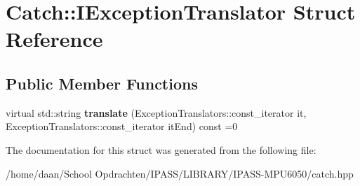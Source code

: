 \hypertarget{structCatch_1_1IExceptionTranslator}{}\section{Catch\+:\+:I\+Exception\+Translator Struct Reference}
\label{structCatch_1_1IExceptionTranslator}
\subsection*{Public Member Functions}
\begin{DoxyCompactItemize}
\item 
\mbox{\label{structCatch_1_1IExceptionTranslator_a2a554b96ed5ed411e7c796b6b42837a5}} 
virtual std\+::string {\bfseries translate} (Exception\+Translators\+::const\+\_\+iterator it, Exception\+Translators\+::const\+\_\+iterator it\+End) const =0
\end{DoxyCompactItemize}


The documentation for this struct was generated from the following file\+:\begin{DoxyCompactItemize}
\item 
/home/daan/\+School Opdrachten/\+I\+P\+A\+S\+S/\+L\+I\+B\+R\+A\+R\+Y/\+I\+P\+A\+S\+S-\/\+M\+P\+U6050/catch.\+hpp\end{DoxyCompactItemize}
